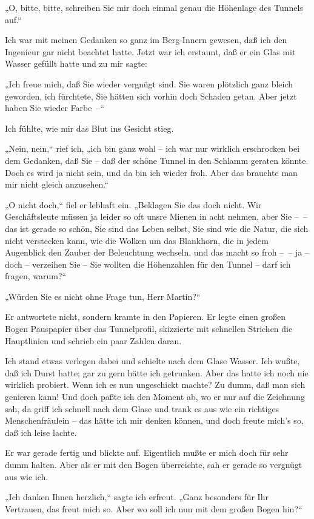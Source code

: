 „O, bitte, bitte, schreiben Sie mir doch einmal genau die Höhenlage
des Tunnels auf.“

Ich war mit meinen Gedanken so ganz im Berg-Innern gewesen, daß ich
den Ingenieur gar nicht beachtet hatte. Jetzt war ich erstaunt, daß
er ein Glas mit Wasser gefüllt hatte und zu mir sagte:

„Ich freue mich, daß Sie wieder vergnügt sind. Sie waren plötzlich
ganz bleich geworden, ich fürchtete, Sie hätten sich vorhin doch
Schaden getan. Aber jetzt haben Sie wieder Farbe~–“

Ich fühlte, wie mir das Blut ins Gesicht stieg.

„Nein, nein,“ rief ich, „ich bin ganz wohl – ich war nur wirklich
erschrocken bei dem Gedanken, daß Sie – daß der schöne Tunnel in
den Schlamm geraten könnte. Doch es wird ja nicht sein, und da bin
ich wieder froh. Aber das brauchte man mir nicht gleich
anzusehen.“

„O nicht doch,“ fiel er lebhaft ein. „Beklagen Sie das doch nicht.
Wir Geschäftsleute müssen ja leider so oft unsre Mienen in acht
nehmen, aber Sie –~– das ist gerade so schön, Sie sind das Leben
selbst, Sie sind wie die Natur, die sich nicht verstecken kann, wie
die Wolken um das Blankhorn, die in jedem Augenblick den Zauber der
Beleuchtung wechseln, und das macht so froh –~– ja – doch –
verzeihen Sie – Sie wollten die Höhenzahlen für den Tunnel – darf
ich fragen, warum?“

„Würden Sie es nicht ohne Frage tun, Herr Martin?“

Er antwortete nicht, sondern kramte in den Papieren. Er legte einen
großen Bogen Pauspapier über das Tunnelprofil, skizzierte mit
schnellen Strichen die Hauptlinien und schrieb ein paar Zahlen
daran.

Ich stand etwas verlegen dabei und schielte nach dem Glase Wasser.
Ich wußte, daß ich Durst hatte; gar zu gern hätte ich getrunken.
Aber das hatte ich noch nie wirklich probiert. Wenn ich es nun
ungeschickt machte? Zu dumm, daß man sich genieren kann! Und doch
paßte ich den Moment ab, wo er nur auf die Zeichnung sah, da griff
ich schnell nach dem Glase und trank es aus wie ein richtiges
Menschenfräulein – das hätte ich mir denken können, und doch freute
mich's so, daß ich leise lachte.

Er war gerade fertig und blickte auf. Eigentlich mußte er mich doch
für sehr dumm halten. Aber als er mit den Bogen überreichte, sah er
gerade so vergnügt aus wie ich.

„Ich danken Ihnen herzlich,“ sagte ich erfreut. „Ganz besonders für
Ihr Vertrauen, das freut mich so. Aber wo soll ich nun mit dem
großen Bogen hin?“

